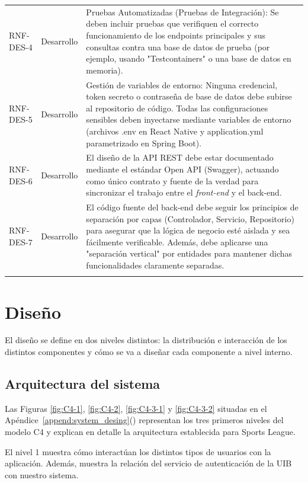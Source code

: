 {\begin{xltabular}{\textwidth}{>{\RaggedRight}p{1.7cm} p{1.8cm} >{\RaggedRight\arraybackslash}X}
        RNF-DES-4 & Desarrollo & Pruebas Automatizadas (Pruebas de Integración): Se deben incluir pruebas que verifiquen el correcto funcionamiento de los endpoints principales y sus consultas contra una base de datos de prueba (por ejemplo, usando "Testcontainers" o una base de datos en memoria). \\ \lightrule
        RNF-DES-5 & Desarrollo & Gestión de variables de entorno: Ninguna credencial, token secreto o contraseña de base de datos debe subirse al repositorio de código. Todas las configuraciones sensibles deben inyectarse mediante variables de entorno (archivos .env en React Native y application.yml parametrizado en Spring Boot). \\ \lightrule
        RNF-DES-6 & Desarrollo & El diseño de la API REST debe estar documentado mediante el estándar Open API (Swagger), actuando como único contrato y fuente de la verdad para sincronizar el trabajo entre el \emph{front-end} y el back-end. \\ \lightrule
        RNF-DES-7 & Desarrollo & El código fuente del back-end debe seguir los principios de separación por capas (Controlador, Servicio, Repositorio) para asegurar que la lógica de negocio esté aislada y sea fácilmente verificable. Además, debe aplicarse una "separación vertical" por entidades para mantener dichas funcionalidades claramente separadas. \\ \lightrule
    \end{xltabular}
}

\section{Diseño}

El diseño se define en dos niveles distintos: la distribución e interacción de los distintos componentes y cómo se va a diseñar cada componente a nivel interno.

\subsection{Arquitectura del sistema}
Las Figuras \ref{fig:C4-1}, \ref{fig:C4-2}, \ref{fig:C4-3-1} y \ref{fig:C4-3-2} situadas en el Apéndice~\ref{append:system_desing}() representan los tres primeros niveles del modelo C4 y explican en detalle la arquitectura establecida para Sports League.

El nivel 1 muestra cómo interactúan los distintos tipos de usuarios con la aplicación. Además, muestra la relación del servicio de autenticación de la UIB con nuestro sistema.

